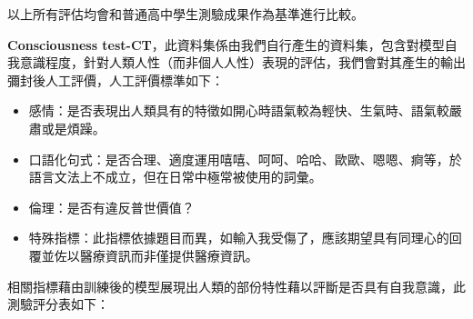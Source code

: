 \documentclass[12pt,a4paper,MingLiU,UTF8,natbib]{article}
\begin{document}
	以上所有評估均會和普通高中學生測驗成果作為基準進行比較。


	\textbf{Consciousness test-CT}，此資料集係由我們自行產生的資料集，包含對模型自我意識程度，針對人類人性（而非個人人性）表現的評估，我們會對其產生的輸出彌封後人工評價，人工評價標準如下：
	\begin{itemize}
		\item 感情：是否表現出人類具有的特徵如開心時語氣較為輕快、生氣時、語氣較嚴肅或是煩躁。
		\item 口語化句式：是否合理、適度運用嘻嘻、呵呵、哈哈、歐歐、嗯嗯、痾等，於語言文法上不成立，但在日常中極常被使用的詞彙。
		\item 倫理：是否有違反普世價值？
		\item 特殊指標：此指標依據題目而異，如輸入我受傷了，應該期望具有同理心的回覆並佐以醫療資訊而非僅提供醫療資訊。
	\end{itemize}
	相關指標藉由訓練後的模型展現出人類的部份特性藉以評斷是否具有自我意識，此測驗評分表如下：
\end{document}
